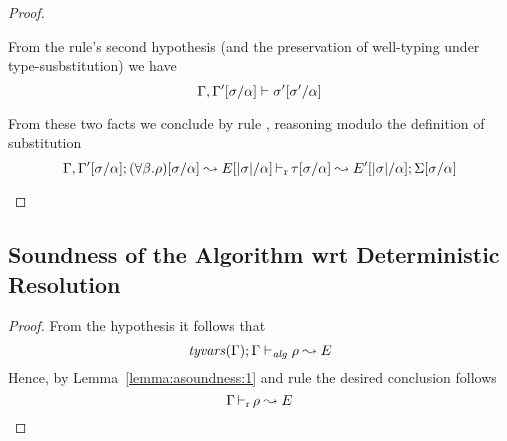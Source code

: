 \begin{proof}
\begin{description}
  From the rule's second hypothesis (and the preservation of well-typing under type-susbstitution) we have
\begin{equation*}
  \Gamma,\Gamma'[\sigma/\alpha] \vdash \sigma'[\sigma'/\alpha]
\end{equation*}

  From these two facts we conclude by rule , reasoning modulo
  the definition of substitution
\begin{equation*}
  \Gamma,\Gamma'[\sigma/\alpha]; (\forall\beta.\rho)[\sigma/\alpha] \leadsto E[|\sigma|/\alpha] \mathop{\vdash_{\mathrm{r}}} \tau[\sigma/\alpha] \leadsto E'[|\sigma|/\alpha]; \Sigma[\sigma/\alpha]
\end{equation*}

\end{description}
\end{proof}

\subsection{Soundness of the Algorithm wrt Deterministic Resolution}



\begin{proof}
  From the hypothesis it follows that 
\begin{equation*}
  \mathit{tyvars}(\Gamma);\Gamma \vdash_{\mathit{alg}} \rho \leadsto E
\end{equation*}
  Hence, by Lemma~\ref{lemma:asoundness:1} and rule  the desired conclusion follows
\begin{equation*}
  \Gamma \mathop{\vdash_{\mathrm{r}}} \rho \leadsto E
\end{equation*}
\end{proof}

